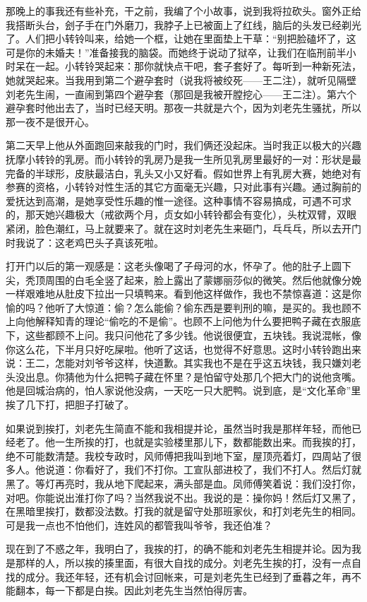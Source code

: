 那晚上的事我还有些补充，干之前，我编了个小故事，说到我将拉砍头。窗外正给我搭断头台，刽子手在门外磨刀，我脖子上已被面上了红线，脑后的头发已经剃光了。人们把小转铃叫来，给她一个框，让她在里面垫上干草：“别把脸磕坏了，这可是你的未婚夫！”准备接我的脑袋。而她终于说动了狱卒，让我们在临刑前半小时呆在一起。小转铃哭起来：那你就快点干吧，套子套好了。每听到一种新死法，她就哭起来。当我用到第二个避孕套时（说我将被绞死——王二注），就听见隔壁刘老先生闹，一直闹到第四个避孕套（那回是我被开膛挖心——王二注）。第六个避孕套时他出去了，当时已经天明。那夜一共就是六个，因为刘老先生骚扰，所以那一夜不是很开心。 

第二天早上他从外面跑回来敲我的门时，我们俩还没起床。当时我正以极大的兴趣抚摩小转铃的乳房。而小转铃的乳房乃是我一生所见乳房里最好的一对：形状是最完备的半球形，皮肤最洁白，乳头又小又好看。假如世界上有乳房大赛，她绝对有参赛的资格，小转铃对性生活的其它方面毫无兴趣，只对此事有兴趣。通过胸前的爱抚达到高潮，是她享受性乐趣的惟一途径。这种事情不容易搞成，可遇不可求的，那天她兴趣极大（戒欲两个月，贞女如小转铃都会有变化），头枕双臂，双眼紧闭，脸色潮红，马上就要来了。就在这时刘老先生来砸门，乓乓乓，所以去开门时我说了：这老鸡巴头子真该死啦。 

打开门以后的第一观感是：这老头像喝了子母河的水，怀孕了。他的肚子上圆下尖，秃顶周围的白毛全竖了起来，脸上露出了蒙娜丽莎似的微笑。然后他就像分娩一样艰难地从肚皮下拉出一只填鸭来。看到他这样做作，我也不禁惊喜道：这是你愉的吗？他听了大惊道：偷？怎么能偷？偷东西是要判刑的嘛，是买的。我也顾不上向他解释知青的理论“偷吃的不是偷”。也顾不上问他为什么要把鸭子藏在衣服底下，这些都顾不上问。我只问他花了多少钱。他说很便宜，五块钱。我说混帐，像你这么花，下半月只好吃屎啦。他听了这话，也觉得不好意思。这时小转铃跑出来说：王二，怎能对刘爷爷这样，快道歉。其实我也不是在乎这五块钱，我只嫌刘老头没出息。你猜他为什么把鸭子藏在怀里？是怕留守处那几个把大门的说他贪嘴。他是回城治病的，怕人家说他没病，一天吃一只大肥鸭。说到底，是“文化革命”里挨了几下打，把胆子打破了。 

如果说到挨打，刘老先生简直不能和我相提并论，虽然当时我是那样年轻，而他已经老了。他一生所挨的打，也就是实验楼里那儿下，数都能数出来。而我挨的打，绝不可能数清楚。我校专政时，风师傅把我叫到地下室，屋顶亮着灯，四周站了很多人。他说道：你看好了，我们不打你。工宣队部进校了，我们不打人。然后灯就黑了。等灯再亮时，我从地下爬起来，满头部是血。凤师傅笑着说：我们没打你，对吧。你能说出淮打你了吗？当然我说不出。我说的是：操你妈！然后灯又黑了，在黑暗里挨打，数都没法数。打我的就是留守处那班家伙，和打刘老先生的相同。可是我一点也不怕他们，连姓风的都管我叫爷爷，我还伯准？ 

现在到了不惑之年，我明白了，我挨的打，的确不能和刘老先生相提并论。因为我是那样的人，所以挨的揍里面，有很大自找的成分。刘老先生挨的打，没有一点自找的成分。我还年轻，还有机会讨回帐来，可是刘老先生已经到了垂暮之年，再不能翻本，每一下都是白挨。因此刘老先生当然怕得厉害。 

